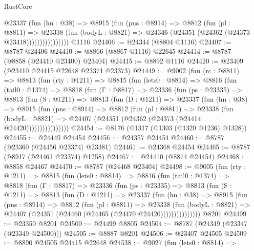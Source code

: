 \begin{lexlean}{RustCore}
\begin{coremodule}
                    @23337
                      (fun (hn : @38) =>
                      @8915
                        (fun (pns : @8914) =>
                        @8812
                          (fun (pl : @8811) =>
                          @23338
                            (fun (bodyL : @8821) =>
                            @24346 (@24351 (@24362 (@24373 @23418))))))))))))))))
    @1116
@24406 := @24344 (@8804 @1116)
@24407 := @8787 @24406
@24410 := @8866 (@8867 @1116) @22645
@24414 := @8787 (@8858 (@24410 @23400) @23404)
@24415 := @8892 @1116
@24420 := @23409 (@23410 @24415 @22648 @23371 @23373)
@24449 := @9002
    (fun (rc : @8811) =>
    @8813
      (fun (rty : @1211) =>
      @8815
        (fun (lets0 : @8814) =>
        @8816
          (fun (tail0 : @1374) =>
          @8818
            (fun (Γ : @8817) =>
            @23336
              (fun (ps : @23335) =>
              @8813
                (fun (S : @1211) =>
                @8813
                  (fun (D : @1211) =>
                  @23337
                    (fun (hn : @38) =>
                    @8915
                      (fun (pns : @8914) =>
                      @8812
                        (fun (pl : @8811) =>
                        @23338
                          (fun (bodyL : @8821) =>
                          @24407 (@24351 (@24362 (@24373 (@24414 @24420))))))))))))))))
@24454 := @8176 (@1317 (@1303 (@1320 @1236) @1328))
@24455 := @24449 @24454
@24456 := @24357 @24454
@24460 := @8787 (@23360 (@24456 @23374) @23381)
@24461 := @24368 @24454
@24465 := @8787 (@8917 (@24461 @23374) @1258)
@24467 := @24410 (@8874 @24454)
@24468 := @8858 @24467
@24470 := @8787 (@24468 @23404)
@24498 := @9005
    (fun (rty : @1211) =>
    @8815
      (fun (lets0 : @8814) =>
      @8816
        (fun (tail0 : @1374) =>
        @8818
          (fun (Γ : @8817) =>
          @23336
            (fun (ps : @23335) =>
            @8813
              (fun (S : @1211) =>
              @8813
                (fun (D : @1211) =>
                @23337
                  (fun (hn : @38) =>
                  @8915
                    (fun (pns : @8914) =>
                    @8812
                      (fun (pl : @8811) =>
                      @23338
                        (fun (bodyL : @8821) =>
                        @24407 (@24351 (@24460 (@24465 (@24470 @24420)))))))))))))))
    @8201
@24499 := @23350 @8201
@24500 := @24499 @8805
@24504 := @8787 (@24349 (@23347 (@23349 @24500)))
@24505 := @8887 @8201
@24506 := @23407 @24505
@24509 := @8890 @24505 @24415 @22648
@24538 := @9027
    (fun (lets0 : @8814) =>

\end{coremodule}
\end{lexlean}
